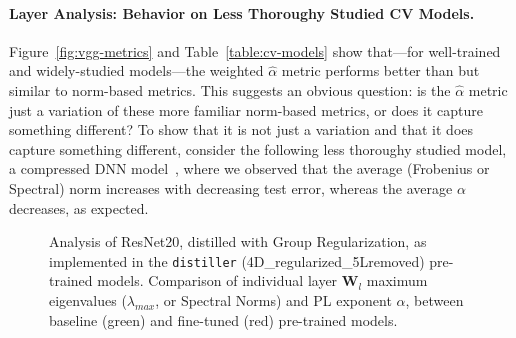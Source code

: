 \paragraph{Layer Analysis: Behavior on Less Thoroughy Studied CV Models.}

Figure~\ref{fig:vgg-metrics} and Table~\ref{table:cv-models} show that---for well-trained and widely-studied models---the weighted $\hat{\alpha}$ metric performs better than but similar to norm-based metrics.
This suggests an obvious question: is the $\hat{\alpha}$ metric just a variation of these more familiar norm-based metrics, or does it capture something different?  
To show that it is not just a variation and that it does capture something different, consider the following less thoroughy studied model, a compressed DNN model~\cite{CWZZ17_TR}, where we observed that the average (Frobenius or Spectral) norm increases with decreasing test error, whereas the average $\alpha$ decreases, as expected.  

\begin{figure}[t]
   \centering
   \qquad
   \caption{
     Analysis of ResNet20, distilled with Group Regularization, as implemented in the \texttt{distiller} (4D\_regularized\_5Lremoved) pre-trained models.  
     Comparison of individual layer $\mathbf{W}_{l}$ maximum eigenvalues ($\lambda_{max}$, or Spectral Norms) and  
     PL exponent $\alpha$, between baseline (green) and fine-tuned (red)  pre-trained models.   
           }
   \label{fig:resnet204D5L}
\end{figure}

